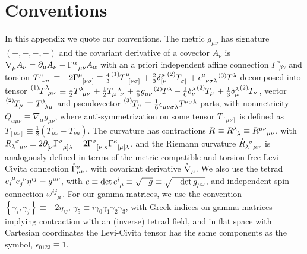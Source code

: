 \documentclass[aps,prd,reprint,preprintnumbers,showpacs,floatfix,nofootinbib,superscript address,longbibliography]{revtex4-1}
\begin{document}
\section{Conventions}\label{Conventions}

In this appendix we quote our conventions. The metric $g_{\mu\nu}$ has signature $\left(+,-,-,-\right)$ and the covariant derivative of a covector $A_\nu$ is $\rcD{_\mu} A_\nu = \partial_\mu A_\nu - \Gamma^\alpha_{~~ \mu\nu} A_\alpha$ with an a priori independent affine connection $\Gamma^\alpha_{~~\beta \gamma}$ and torsion $\tensor{T}{^\mu_{\nu\sigma}}\equiv -2\rcCon{^\mu_{[\nu\sigma]}}\equiv\frac{4}{3}\T[1]{^\mu_{[\nu\sigma]}}+\frac{2}{3}\tensor*{\delta}{^\mu_{[\nu}}\T[2]{_{\sigma]}}+\tensor{\epsilon}{^\mu_{\nu\sigma\lambda}}\T[3]{^\lambda}$ decomposed into tensor $\T[1]{^\lambda_{\mu\nu}}\equiv\frac{1}{2}\tensor{T}{^\lambda_{\mu\nu}}+\tfrac{1}{2}\tensor{T}{_\mu^\lambda_\nu}+\tfrac{1}{6}\tensor{g}{_{\mu\nu}}\T[2]{^\lambda}-\tfrac{1}{6}\tensor*{\delta}{^\lambda_\nu}\T[2]{_\mu}+\tfrac{1}{3}\tensor*{\delta}{^\lambda_\mu}\T[2]{_\nu}$, vector $\T[2]{_\mu}\equiv\tensor{T}{^\lambda_{\lambda\mu}}$ and pseudovector $\T[3]{_\mu}\equiv\tfrac{1}{6}\tensor{\epsilon}{_{\mu\nu\sigma\lambda}}\tensor{T}{^{\nu\sigma\lambda}}$ parts, with nonmetricity $Q_{\alpha\mu\nu}\equiv\nabla_\alpha g_{\mu\nu}$, where anti-symmetrization on some tensor $T_{[\mu\nu]}$ is defined as $T_{[\mu\nu]} \equiv \frac{1}{2}(T_{\mu\nu}-T_{\nu\mu})$. The curvature has contractions $\rcR{}\equiv\rcR{^\lambda_\lambda}\equiv\rcR{^{\mu\nu}_{\mu\nu}}$, with $\rcR{_\lambda^\sigma_{\mu\nu}}\equiv 2\PD{_{[\nu}}\rcCon{^\sigma_{\mu]\lambda}}+2\rcCon{^\sigma_{[\nu|\kappa}}\rcCon{^\kappa_{|\mu]\lambda}}$, and the Riemann curvature $\rR{_\lambda^\sigma_{\mu\nu}}$ is analogously defined in terms of the metric-compatible and torsion-free Levi-Civita connection $\rCon{^\sigma_{\mu\nu}}$, with covariant derivative $\rD{_\mu}$. We also use the tetrad $\tensor{e}{_i^\mu}\tensor{e}{_j^\nu}\tensor{\eta}{^{ij}}\equiv\tensor{g}{^{\mu\nu}}$, with $e\equiv\det\tensor{e}{^i_\mu}\equiv\sqrt{-g}\equiv\sqrt{-\det\tensor{g}{_{\mu\nu}}}$, and independent spin connection $\tensor{\omega}{^{ij}_\mu}$. For our gamma matrices, we use the convention $\left\{\gamma_i, \gamma_j \right\} \equiv - 2 \eta_{ij}$, $\gamma_5 \equiv i \gamma_0 \gamma_1 \gamma_2 \gamma_3$, with Greek indices on gamma matrices implying contraction with an (inverse) tetrad field, and in flat space with Cartesian coordinates the Levi-Civita tensor has the same components as the symbol, $\epsilon_{0123}\equiv 1$.
\end{document}

